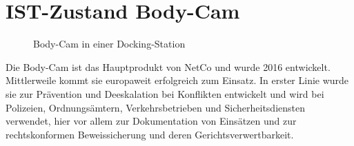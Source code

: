 \documentclass[thesis.tex]{subfiles}
\begin{document}
\section{IST-Zustand Body-Cam}

\begin{figure}[h]
    \centering
    \qquad
    \caption[Body-Cam in einer Docking-Station]{Body-Cam in einer Docking-Station \cite{netco}}
    \label{fig:BC_dock}
\end{figure}

Die Body-Cam ist das Hauptprodukt von NetCo und wurde 2016 entwickelt. Mittlerweile kommt sie europaweit erfolgreich zum Einsatz.
In erster Linie wurde sie zur Prävention und Deeskalation bei Konflikten entwickelt und wird bei Polizeien, Ordnungsämtern, Verkehrsbetrieben und Sicherheitsdiensten verwendet, hier vor allem zur Dokumentation von Einsätzen und zur rechtskonformen Beweissicherung und deren Gerichtsverwertbarkeit.
\end{document}
